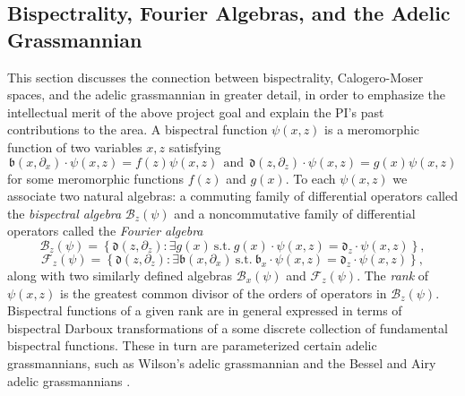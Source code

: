 \documentclass[11pt,letterpaper]{article}
\theoremstyle{definition}
\newcommand{\vocab}[1]{\emph{#1}}
\begin{document}
\subsection{Bispectrality,  Fourier Algebras, and the Adelic Grassmannian}
This section discusses the connection between bispectrality, Calogero-Moser spaces, and the adelic grassmannian in greater detail, in order to emphasize the intellectual merit of the above project goal and explain the PI's past contributions to the area.
A bispectral function $\psi(x,z)$ is a meromorphic function of two variables $x,z$ satisfying
$$\mathfrak b(x,\partial_x)\cdot\psi(x,z) = f(z)\psi(x,z)\ \ \text{and}\ \ \mathfrak d(z,\partial_z)\cdot\psi(x,z) = g(x)\psi(x,z)$$
for some meromorphic functions $f(z)$ and $g(x)$.
To each $\psi(x,z)$ we associate two natural algebras: a commuting family of differential operators called the \vocab{bispectral algebra} $\mathcal B_z(\psi)$ and a noncommutative family of differential operators called the \vocab{Fourier algebra}
$$\mathcal B_z(\psi) = \left\lbrace\mathfrak d(z,\partial_z): \exists g(x)\ \text{s.t.}\ g(x)\cdot\psi(x,z) = \mathfrak d_z\cdot\psi(x,z)\right\rbrace,$$
$$\mathcal F_z(\psi) = \left\lbrace\mathfrak d(z,\partial_z): \exists\mathfrak b(x,\partial_x)\ \text{s.t.}\ \mathfrak b_x\cdot\psi(x,z) = \mathfrak d_z\cdot\psi(x,z)\right\rbrace,$$
along with two similarly defined algebras $\mathcal B_x(\psi)$ and $\mathcal F_z(\psi)$.
The \vocab{rank} of $\psi(x,z)$ is the greatest common divisor of the orders of operators in $\mathcal B_z(\psi)$.
Bispectral functions of a given rank are in general expressed in terms of bispectral Darboux transformations of a some discrete collection of fundamental bispectral functions.
These in turn are parameterized certain adelic grassmannians, such as Wilson's adelic grassmannian \cite{Wilson98} and the Bessel and Airy adelic grassmannians \cite{CGYZ}.
\end{document}
